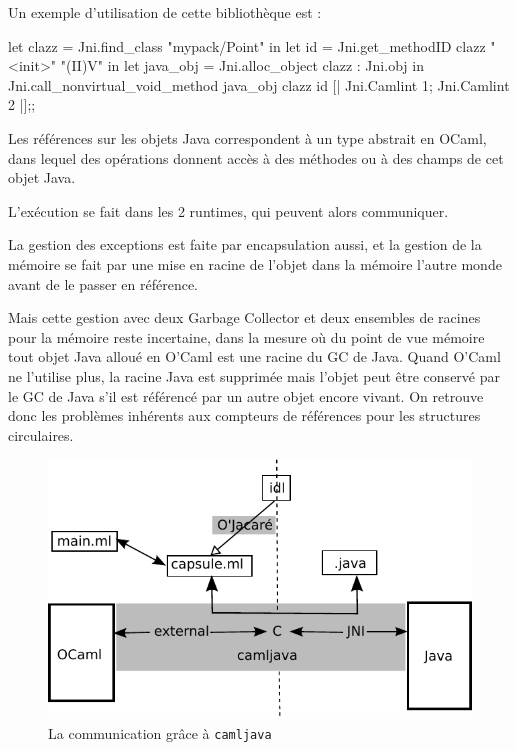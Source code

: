 \documentclass[a4paper, 11pt]{article}
\newcommand{\camljava}{{\tt{camljava}}}
\begin{document}
Un exemple d'utilisation de cette bibliothèque est :
\begin{OCamlEx}
let clazz = Jni.find_class "mypack/Point" in
let id = Jni.get_methodID clazz "<init>" "(II)V" in
let java_obj = Jni.alloc_object clazz : Jni.obj in
Jni.call_nonvirtual_void_method java_obj clazz id 
          [| Jni.Camlint 1; Jni.Camlint 2 |];;
\end{OCamlEx}

Les références sur les objets Java correspondent à un type abstrait en
OCaml, dans lequel des opérations donnent accès à des méthodes ou à des
champs de cet objet Java. 

L'exécution se fait dans les 2 runtimes, qui peuvent alors communiquer.

La gestion des exceptions est faite par encapsulation aussi, et la
gestion de la mémoire se fait par une mise en racine de l'objet dans la mémoire
l'autre monde avant de le passer en référence.

Mais cette gestion avec deux Garbage Collector et deux ensembles de racines pour la mémoire reste incertaine, dans la mesure où 
du point de vue mémoire tout objet Java alloué en O’Caml est une
racine du GC de Java. Quand O’Caml ne l’utilise plus, la racine Java
est supprimée mais l’objet peut être conservé par le GC de Java s’il
est référencé par un autre objet encore vivant. On retrouve
donc les problèmes inhérents aux compteurs de références pour les
structures circulaires.



\begin{figure}[h]
  \centering
  \includegraphics{schemaCamljava2.pdf}
  \caption{La communication grâce à \camljava}
\end{figure}
\end{document}
